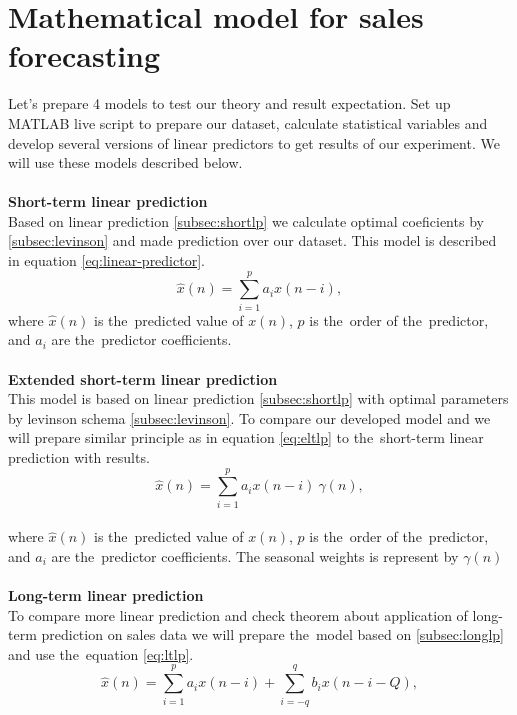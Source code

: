 \section{Mathematical model for sales forecasting}\label{subsec:calculate_models}
Let's prepare 4 models to test our theory and result expectation.  Set up MATLAB live script to prepare our dataset,
calculate statistical variables and develop several versions of linear predictors to get results of our experiment.
We will use these models described below.\\
\\
\textbf{Short-term linear prediction}\\
Based on linear prediction \ref{subsec:shortlp} we calculate optimal coeficients by \ref{subsec:levinson} and
made prediction over our dataset. This model is described in equation \ref{eq:linear-predictor}.
\begin{equation}
    \hat{x}(n) = \sum_{i=1}^{p} a_i x(n-i),
\end{equation}
where $\hat{x}(n)$ is the~predicted value of $x(n)$, $p$ is the~order of the~predictor, and $a_i$ are the~predictor coefficients.\\
\\
\textbf{Extended short-term linear prediction}\\
This model is based on linear prediction \ref{subsec:shortlp} with optimal parameters by levinson
schema \ref{subsec:levinson}. To compare our developed model \label{subsec:extlonglp} and we will prepare
similar principle as in equation \ref{eq:eltlp} to the~short-term linear prediction with results.
\begin{equation} \label{eq:slp}
    \hat{x}(n) = \sum_{i=1}^{p} a_i x(n-i) ~\gamma(n),
\end{equation}
\\
where $\hat{x}(n)$ is the~predicted value of $x(n)$, $p$ is the~order of the~predictor, and $a_i$ are the~predictor coefficients.
The seasonal weights is represent by $\gamma(n)$\\
\\
\textbf{Long-term linear prediction}\\
To compare more linear prediction and check theorem about application of long-term prediction on sales data
we will prepare the~model based on \ref{subsec:longlp} and use the~equation \ref{eq:ltlp}.
\begin{equation}
    \hat{x}(n) = \sum_{i=1}^{p} a_i x(n-i) + \sum_{i=-q}^{q} b_i x(n-i-Q),
\end{equation}
